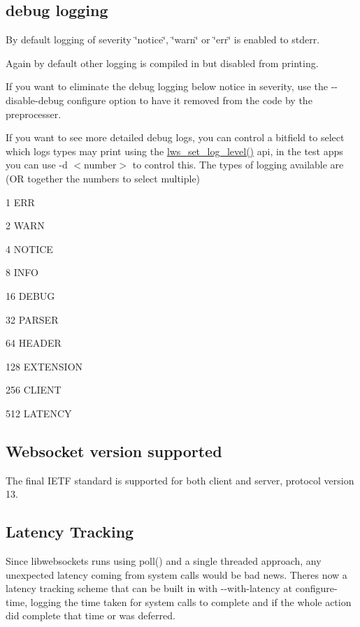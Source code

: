 \subsection*{debug logging }

By default logging of severity \char`\"{}notice\char`\"{}, \char`\"{}warn\char`\"{} or \char`\"{}err\char`\"{} is enabled to stderr.

Again by default other logging is compiled in but disabled from printing.

If you want to eliminate the debug logging below notice in severity, use the {\ttfamily -\/-\/disable-\/debug} configure option to have it removed from the code by the preprocesser.

If you want to see more detailed debug logs, you can control a bitfield to select which logs types may print using the {\ttfamily \hyperlink{group__log_ga244647f9e1bf0097ccdde66d74f41e26}{lws\+\_\+set\+\_\+log\+\_\+level()}} api, in the test apps you can use {\ttfamily -\/d $<$number$>$} to control this. The types of logging available are (OR together the numbers to select multiple)


\begin{DoxyItemize}
\item 1 E\+RR
\item 2 W\+A\+RN
\item 4 N\+O\+T\+I\+CE
\item 8 I\+N\+FO
\item 16 D\+E\+B\+UG
\item 32 P\+A\+R\+S\+ER
\item 64 H\+E\+A\+D\+ER
\item 128 E\+X\+T\+E\+N\+S\+I\+ON
\item 256 C\+L\+I\+E\+NT
\item 512 L\+A\+T\+E\+N\+CY
\end{DoxyItemize}

\subsection*{Websocket version supported }

The final I\+E\+TF standard is supported for both client and server, protocol version 13.

\subsection*{Latency Tracking }

Since libwebsockets runs using {\ttfamily poll()} and a single threaded approach, any unexpected latency coming from system calls would be bad news. There\textquotesingle{}s now a latency tracking scheme that can be built in with {\ttfamily -\/-\/with-\/latency} at configure-\/time, logging the time taken for system calls to complete and if the whole action did complete that time or was deferred.


